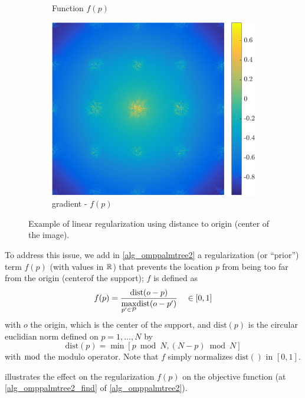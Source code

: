 \begin{figure}[!h]
\begin{subfigure}[b]{0.325\textwidth}
\caption{Function $f(p)$}\label{}
\end{subfigure}
\begin{subfigure}[b]{0.325\textwidth}\centering
\includegraphics[width=1\textwidth]{figures/tree-scattered-supports/regularized.pdf}
\caption{gradient - $f(p)$}\label{}
\end{subfigure}
\caption{Example of linear regularization using distance to origin (center of the image).}\label{fig_grad_minus_dist}
\end{figure}

\noindent
To address this issue, we add in \cref{alg_omppalmtree2} a regularization (or “prior”) term $f(p)$ (with values in $\R$) that prevents the location $p$ from being too far from the origin (center\footnotemark[1] of the support); $f$ is defined as
\begin{equation}
f(p) = \frac{\text{dist}(o-p)}{\underset{p' \in \P}{\max}\text{dist}(o-p')} \quad \in [0,1]\label{eq_regularized1}
\end{equation}
with $o$ the origin, which is the center of the support, and $\text{dist}(p)$ is the circular euclidian norm defined on $p=1,\dots,N$ by\footnotemark[2]
\begin{equation*} \text{dist}(p) = \min\left[p \bmod N, (N-p) \bmod N\right]\end{equation*}
with $\bmod$ the modulo operator. Note that $f$ simply normalizes $\text{dist}()$ in $[0,1]$. 

\noindent
{} illustrates the effect on the regularization $f(p)$ on the objective function (at \cref{alg_omppalmtree2_find} of \cref{alg_omppalmtree2}).



